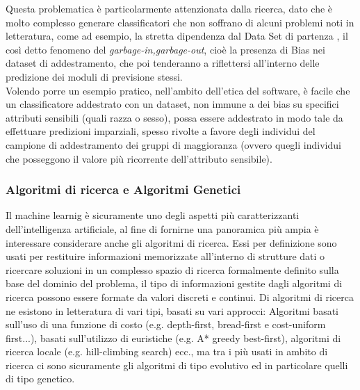 Questa problematica è particolarmente attenzionata dalla ricerca, dato che è molto complesso generare classificatori che non soffrano di alcuni problemi noti in letteratura, come ad esempio, la stretta dipendenza dal Data Set di partenza \cite{supervisedML&Classification}, il così detto fenomeno del \textit{garbage-in,garbage-out}, cioè la presenza di Bias nei dataset di addestramento, che poi tenderanno a riflettersi all'interno delle predizione dei moduli di previsione stessi\cite{evalFairClassification}.\\

\cite{evalFairClassification} Volendo porre un esempio pratico, nell'ambito dell'etica del software, è facile che un classificatore addestrato con un dataset, non immune a dei bias su specifici attributi sensibili (quali razza o sesso), possa essere addestrato in modo tale da effettuare predizioni imparziali, spesso rivolte a favore degli individui del campione di addestramento dei gruppi di maggioranza (ovvero quegli individui che posseggono il valore più ricorrente dell'attributo sensibile).


\subsubsection{Algoritmi di ricerca e Algoritmi Genetici}
Il machine learnig è sicuramente uno degli aspetti più caratterizzanti dell'intelligenza artificiale, al fine di fornirne una panoramica più ampia è interessare considerare anche gli algoritmi di ricerca. Essi per definizione sono usati per restituire informazioni memorizzate all'interno di strutture dati o ricercare soluzioni in un complesso spazio di ricerca formalmente definito sulla base del dominio del problema, il tipo di informazioni gestite dagli algoritmi di ricerca possono essere formate da valori discreti e continui. Di algoritmi di ricerca ne esistono in letteratura di vari tipi, basati su vari approcci: Algoritmi basati sull'uso di una funzione di costo (e.g. depth-first, bread-first e cost-uniform first...), basati sull'utilizzo di euristiche (e.g. A* greedy best-first), algoritmi di ricerca locale (e.g. hill-climbing search) ecc., ma tra i più usati in ambito di ricerca ci sono sicuramente gli algoritmi di tipo evolutivo ed in particolare quelli di tipo genetico.

